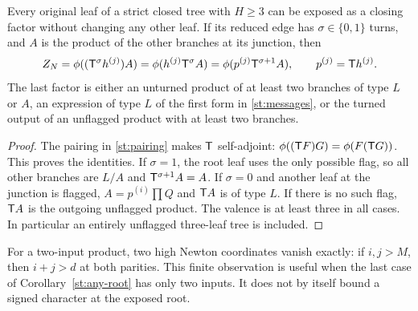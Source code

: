 \begin{corollary}\label{st:any-root}
Every original leaf of a strict closed tree with $H\ge3$
can be exposed as a closing factor without changing
any other leaf. If its reduced edge has $\sigma\in\{0,1\}$ turns,
and $A$ is the product of the other branches at its
junction, then
\[
 Z_N=\phi((\mathsf T^\sigma h^{(j)})A)
     =\phi(h^{(j)}\mathsf T^\sigma A)
     =\phi(p^{(j)}\mathsf T^{\sigma+1}A),\qquad p^{(j)}=\mathsf T h^{(j)} .
\]
The last factor is either an unturned product of at least
two branches of type $L$ or $A$, an expression of type $L$ of the
first form in \eqref{st:messages}, or the turned output of an
unflagged product with at least two branches.
\end{corollary}
\begin{proof}
The pairing in \eqref{st:pairing} makes $\mathsf T$ self-adjoint:
$\phi((\mathsf T F)G)=\phi(F(\mathsf T G))$. This proves the identities.
If $\sigma=1$, the root leaf uses the only possible flag,
so all other branches are $L/A$ and
$\mathsf T^{\sigma+1}A=A$.
If $\sigma=0$ and another leaf at the junction is flagged,
$A=p^{(i)}\prod Q$ and $\mathsf T A$ is of type $L$.
If there is no such flag, $\mathsf T A$ is the outgoing
unflagged product. The valence is at least three in
all cases. In particular an entirely unflagged
three-leaf tree is included.
\end{proof}
For a two-input product, two high Newton coordinates
vanish exactly: if $i,j>M$, then $i+j>d$ at both
parities. This finite observation is useful when the
last case of Corollary~\ref{st:any-root} has only
two inputs. It does not by itself bound a signed
character at the exposed root.
